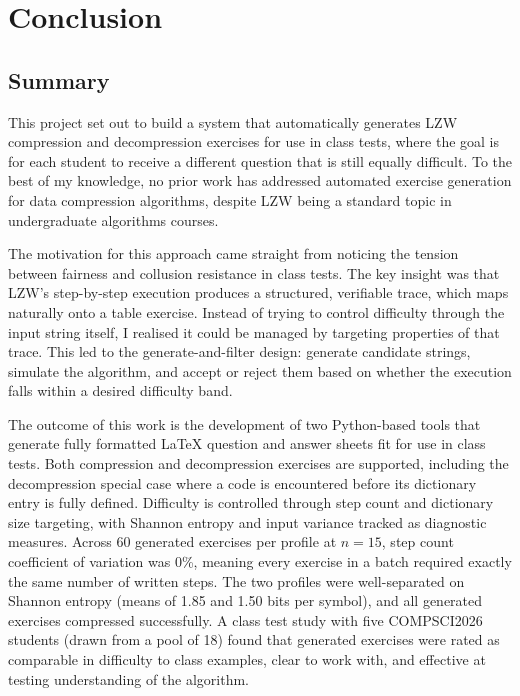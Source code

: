 \documentclass{l4proj}
\begin{document}
\chapter{Conclusion}

\section{Summary}

This project set out to build a system that automatically generates LZW compression and decompression exercises for use in class tests, where the goal is for each student to receive a different question that is still equally difficult. To the best of my knowledge, no prior work has addressed automated exercise generation for data compression algorithms, despite LZW being a standard topic in undergraduate algorithms courses.

The motivation for this approach came straight from noticing the tension between fairness and collusion resistance in class tests. The key insight was that LZW’s step-by-step execution produces a structured, verifiable trace, which maps naturally onto a table exercise. Instead of trying to control difficulty through the input string itself, I realised it could be managed by targeting properties of that trace. This led to the generate-and-filter design: generate candidate strings, simulate the algorithm, and accept or reject them based on whether the execution falls within a desired difficulty band.

The outcome of this work is the development of two Python-based tools that generate fully formatted LaTeX question and answer sheets fit for use in class tests. Both compression and decompression exercises are supported, including the decompression special case where a code is encountered before its dictionary entry is fully defined. Difficulty is controlled through step count and dictionary size targeting, with Shannon entropy and input variance tracked as diagnostic measures. Across 60 generated exercises per profile at $n = 15$, step count coefficient of variation was 0\%, meaning every exercise in a batch required exactly the same number of written steps. The two profiles were well-separated on Shannon entropy (means of \num{1.85} and \num{1.50} bits per symbol), and all generated exercises compressed successfully. A class test study with five COMPSCI2026 students (drawn from a pool of 18) found that generated exercises were rated as comparable in difficulty to class examples, clear to work with, and effective at testing understanding of the algorithm.
\end{document}
